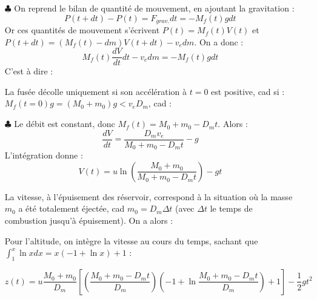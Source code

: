 \documentclass{report}
\begin{document}
\begin{itemize}

	\item[$\clubsuit$] On reprend le bilan de quantité de mouvement, en ajoutant la gravitation :
	\begin{equation}
		P(t+dt)-P(t) = F_{grav.}dt = -M_f(t)gdt
	\end{equation}
	Or ces quantités de mouvement s'écrivent $P(t)=M_f(t)V(t)$ et $P(t+dt)=(M_f(t)-dm)V(t+dt) - v_edm$. 
	On a donc :
	\begin{equation}
		M_f(t)\frac{dV}{dt}dt-v_edm=-M_f(t)gdt
	\end{equation}
C'est à dire :

\noindent{}
	
	La fusée décolle uniquement si son accélération à $t=0$ est positive, cad si : $ M_f(t=0)g=(M_0+m_0)g<v_eD_m$, cad :
	
\noindent{}

	\item[$\clubsuit$] Le débit est constant, donc $M_f(t)=M_0+m_0-D_mt$. Alors :
		\begin{equation}
		\frac{dV}{dt}=\frac{D_mv_e}{M_0+m_0-D_mt}-g
	\end{equation}
	L'intégration donne : 	
		\begin{equation}
		V(t)=u\ln\left(\frac{M_0+m_0}{M_0+m_0-D_mt} \right)  -gt
	\end{equation}
		
	La vitesse, à l'épuisement des réservoir, correspond à la situation où la masse $m_0$ a été totalement éjectée, cad $m_0= D_m\Delta t$ (avec $\Delta t$ le temps de combustion jusqu'à épuisement). On a alors :
	
	\noindent{}
	
	Pour l'altitude, on intègre la vitesse au cours du temps, sachant que $\int_1^x \ln xdx=x(-1+\ln x) + 1$ :
	
	\begin{equation}
		z(t)=u\frac{M_0+m_0}{D_m}\left[ \left( \frac{M_0+m_0-D_mt}{D_m}\right) \left( -1+\ln\frac{M_0+m_0-D_mt}{D_m} \right) +1 \right] -\frac{1}{2}gt^2
	\end{equation}
	

\end{itemize}
\end{document}
